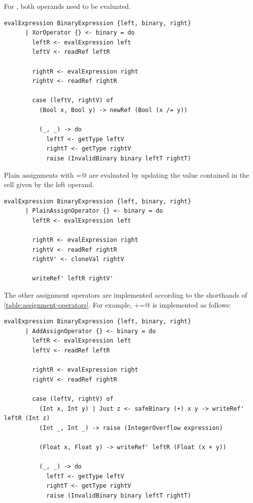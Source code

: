 \documentclass[UdineBachThesis,american,11pt]{PhdThesis}
\begin{document}
  For \lstinline@xor@, both operands need to be evaluated.

  \begin{lstlisting}[gobble=4,basicstyle=\ttfamily\small]
    evalExpression BinaryExpression {left, binary, right}
      | XorOperator {} <- binary = do
        leftR <- evalExpression left
        leftV <- readRef leftR

        rightR <- evalExpression right
        rightV <- readRef rightR

        case (leftV, rightV) of
          (Bool x, Bool y) -> newRef (Bool (x /= y))

          (_, _) -> do
            leftT <- getType leftV
            rightT <- getType rightV
            raise (InvalidBinary binary leftT rightT)
  \end{lstlisting}

  Plain assignments with \lstinline@=@ are evaluated by updating the value
  contained in the cell given by the left operand.

  \begin{lstlisting}[gobble=4,basicstyle=\ttfamily\small]
    evalExpression BinaryExpression {left, binary, right}
      | PlainAssignOperator {} <- binary = do
        leftR <- evalExpression left

        rightR <- evalExpression right
        rightV <- readRef rightR
        rightV' <- cloneVal rightV

        writeRef' leftR rightV'
  \end{lstlisting}

  The other assignment operators are implemented according to the shorthands of
  \autoref{table:assignment-operators}. For example, \lstinline@+=@ is
  implemented as follows:

  \begin{lstlisting}[gobble=4,basicstyle=\ttfamily\small]
    evalExpression BinaryExpression {left, binary, right}
      | AddAssignOperator {} <- binary = do
        leftR <- evalExpression left
        leftV <- readRef leftR

        rightR <- evalExpression right
        rightV <- readRef rightR

        case (leftV, rightV) of
          (Int x, Int y) | Just z <- safeBinary (+) x y -> writeRef' leftR (Int z)
          (Int _, Int _) -> raise (IntegerOverflow expression)

          (Float x, Float y) -> writeRef' leftR (Float (x + y))

          (_, _) -> do
            leftT <- getType leftV
            rightT <- getType rightV
            raise (InvalidBinary binary leftT rightT)
  \end{lstlisting}
\end{document}
